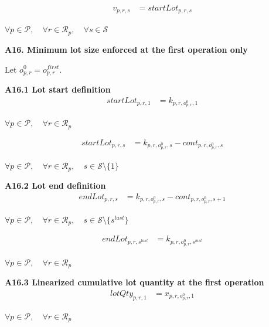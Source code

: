 \documentclass{article}
\begin{document}
\begin{align}
v_{p,r,s}
&=
startLot_{p,r,s}
\label{eq:A16_routing_start_lot_start}
\end{align}
\begin{center}
$\forall p \in \mathcal{P},\quad
\forall r \in \mathcal{R}_p,\quad
\forall s \in \mathcal{S}$
\end{center}


\noindent\textbf{A16. Minimum lot size enforced at the first operation only}

Let $o^0_{p,r}=o^{first}_{p,r}$.

\noindent\textbf{A16.1 Lot start definition}
\begin{align}
startLot_{p,r,1}
&=
k_{p,r,o^0_{p,r},1}
\label{eq:A16_lot_start_shift1}
\end{align}
\begin{center}
$\forall p \in \mathcal{P}, \quad
\forall r \in \mathcal{R}_p$
\end{center}

\begin{align}
startLot_{p,r,s}
&=
k_{p,r,o^0_{p,r},s}
-
cont_{p,r,o^0_{p,r},s}
\label{eq:A16_lot_start}
\end{align}
\begin{center}
$\forall p \in \mathcal{P}, \quad
\forall r \in \mathcal{R}_p, \quad
s \in \mathcal{S}\setminus\{1\}$
\end{center}

\noindent\textbf{A16.2 Lot end definition}
\begin{align}
endLot_{p,r,s}
&=
k_{p,r,o^0_{p,r},s}
-
cont_{p,r,o^0_{p,r},s+1}
\label{eq:A16_lot_end}
\end{align}
\begin{center}
$\forall p \in \mathcal{P}, \quad
\forall r \in \mathcal{R}_p, \quad
s \in \mathcal{S}\setminus\{s^{last}\}$
\end{center}

\begin{align}
endLot_{p,r,s^{last}}
&=
k_{p,r,o^0_{p,r},s^{last}}
\label{eq:A16_lot_end_last}
\end{align}
\begin{center}
$\forall p \in \mathcal{P}, \quad
\forall r \in \mathcal{R}_p$
\end{center}

\noindent\textbf{A16.3 Linearized cumulative lot quantity at the first operation}
\begin{align}
lotQty_{p,r,1}
&=
x_{p,r,o^0_{p,r},1}
\label{eq:A16_lotqty_initial}
\end{align}
\begin{center}
$\forall p \in \mathcal{P}, \quad
\forall r \in \mathcal{R}_p$
\end{center}
\end{document}
